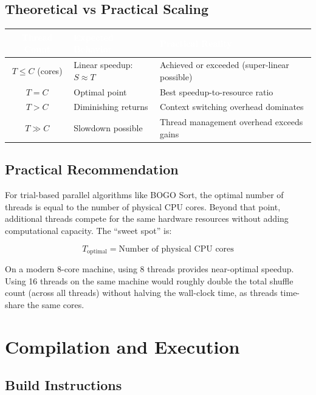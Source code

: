 \documentclass[11pt]{article}
\begin{document}
\subsection{Theoretical vs Practical Scaling}

\begin{center}
\begin{tabular}{|c|l|l|}
\hline
\rowcolor{tableheader}
\textcolor{white}{\textbf{Thread Count}} & \textcolor{white}{\textbf{Expected Behavior}} & \textcolor{white}{\textbf{Practical Reality}} \\ \hline
$T \leq C$ (cores) & Linear speedup: $S \approx T$ & Achieved or exceeded (super-linear possible) \\ \hline
$T = C$ & Optimal point & Best speedup-to-resource ratio \\ \hline
$T > C$ & Diminishing returns & Context switching overhead dominates \\ \hline
$T \gg C$ & Slowdown possible & Thread management overhead exceeds gains \\ \hline
\end{tabular}
\end{center}

\subsection{Practical Recommendation}

For trial-based parallel algorithms like BOGO Sort, the optimal number of threads is equal to the number of physical CPU cores. Beyond that point, additional threads compete for the same hardware resources without adding computational capacity. The ``sweet spot'' is:

$$T_{\text{optimal}} = \text{Number of physical CPU cores}$$

On a modern 8-core machine, using 8 threads provides near-optimal speedup. Using 16 threads on the same machine would roughly double the total shuffle count (across all threads) without halving the wall-clock time, as threads time-share the same cores.

\newpage

\section{Compilation and Execution}

\subsection{Build Instructions}
\end{document}
